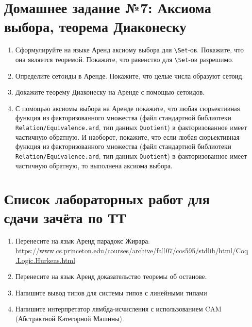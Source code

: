 \documentclass[10pt,a4paper,oneside]{article}
\begin{document}
\section*{Домашнее задание №7: Аксиома выбора, теорема Диаконеску}
\begin{enumerate}
\item Сформулируйте на языке Аренд аксиому выбора для \verb!\Set!-ов. Покажите, что она является теоремой.
Покажите, что равенство для \verb!\Set!-ов разрешимо.
\item Определите сетоиды в Аренде. Покажите, что целые числа образуют сетоид.
\item Докажите теорему Диаконеску на Аренде с помощью сетоидов.
\item С помощью аксиомы выбора на Аренде покажите, что любая сюрьективная функция из факторизованного множества (файл стандартной
библиотеки \verb!Relation/Equivalence.ard!, тип данных \verb!Quotient!) в факторизованное имеет частичную обратную.
И наоборот, покажите, что если любая сюрьективная функция из факторизованного множества (файл стандартной
библиотеки\\ \verb!Relation/Equivalence.ard!, тип данных \verb!Quotient!) в факторизованное имеет частичную обратную, то выполнена аксиома выбора.
\end{enumerate}

\section*{Список лабораторных работ для сдачи зачёта по ТТ}
\begin{enumerate}

\item Перенесите на язык Аренд парадокс Жирара.
\url{https://www.cs.princeton.edu/courses/archive/fall07/cos595/stdlib/html/Coq.Logic.Hurkens.html}

\item Перенесите на язык Аренд доказательство теоремы об останове.

\item Напишите вывод типов для системы типов с линейными типами

\item Напишите интерпретатор лямбда-исчисления с использованием CAM (Абстрактной Категорной Машины).

\end{enumerate}
\end{document}
